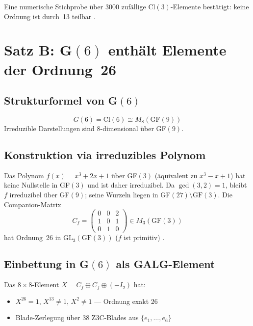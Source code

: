 Eine numerische Stichprobe über 3000 zufällige Cl$(3)$-Elemente bestätigt:
keine Ordnung ist durch~13 teilbar \BM.

\section{Satz B: G$(6)$ enthält Elemente der Ordnung~26}

\subsection{Strukturformel von G$(6)$}

\begin{equation}
  G(6) = \text{Cl}(6) \cong M_8(\text{GF}(9))
\end{equation}
Irreduzible Darstellungen sind 8-dimensional über GF$(9)$.

\subsection{Konstruktion via irreduzibles Polynom}

Das Polynom $f(x) = x^3 + 2x + 1$ über GF$(3)$ (äquivalent zu $x^3 - x + 1$)
hat keine Nullstelle in GF$(3)$ und ist daher irreduzibel.
Da $\gcd(3,2) = 1$, bleibt $f$ irreduzibel über GF$(9)$;
seine Wurzeln liegen in GF$(27) \setminus \text{GF}(3)$.
Die Companion-Matrix
\begin{equation}
  C_f = \begin{pmatrix} 0 & 0 & 2 \\ 1 & 0 & 1 \\ 0 & 1 & 0 \end{pmatrix}
  \in M_3(\text{GF}(3))
\end{equation}
hat Ordnung~26 in $\text{GL}_3(\text{GF}(3))$ ($f$ ist primitiv) \BM.

\subsection{Einbettung in G$(6)$ als GALG-Element}

Das $8 \times 8$-Element $X = C_f \oplus C_f \oplus (-I_2)$ hat:
\begin{itemize}
  \item $X^{26} = 1$, $X^{13} \neq 1$, $X^{2} \neq 1$ --- Ordnung exakt 26 \BM
  \item Blade-Zerlegung über 38 Z3C-Blades aus $\{e_1,\ldots,e_6\}$
\end{itemize}

